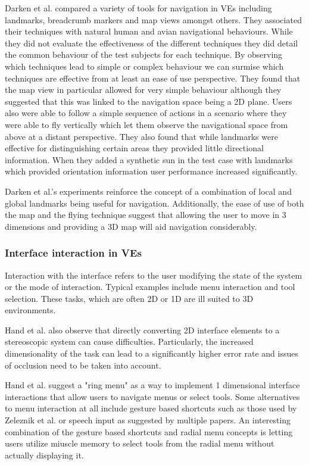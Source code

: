 \documentclass{sig-alternate-05-2015}
\begin{document}
Darken et al. compared a variety of tools for navigation in VEs including landmarks, breadcrumb markers and map views amongst others\cite{Darken1993}. They associated their techniques with natural human and avian  navigational behaviours. While they did not evaluate the effectiveness of the different techniques they did detail the common behaviour of the test subjects for each technique. By observing which techniques lead to simple or complex behaviour we can surmise which techniques are effective from at least an ease of use perspective. They found that the map view in particular allowed for very simple behaviour although they suggested that this was linked to the navigation space being a 2D plane. Users also were able to follow a simple sequence of actions in a scenario where they were able to fly vertically which let them observe the navigational space from above at a distant perspective. They also found that while landmarks were effective for distinguishing certain areas they provided little directional information. When they added a synthetic sun in the test case with landmarks which provided orientation information user performance increased significantly.

Darken et al.'s experiments reinforce the concept of a combination of local and global landmarks being useful for navigation.\cite{Darken1993} Additionally, the ease of use of both the map and the flying technique suggest that allowing the user to move in 3 dimensions and providing a 3D map will aid navigation considerably. 
\subsubsection{Interface interaction in VEs}
 Interaction with the interface refers to the user modifying the state of the system or the mode of interaction\cite{Bowman2001}. Typical examples include menu interaction and tool selection. These tasks, which are often 2D or 1D are ill suited to 3D environments\cite{Bowman2001, Hand1997}.
 
 Hand et al. also observe that directly converting 2D interface elements to a stereoscopic system can cause difficulties.\cite{Hand1997} Particularly, the increased dimensionality of the task can lead to a significantly higher error rate and issues of occlusion need to be taken into account.
 
 Hand et al. suggest a "ring menu" as a way to implement 1 dimensional interface interactions that allow users to navigate menus or select tools.\cite{Hand1997} Some alternatives to menu interaction at all include gesture based shortcuts such as those used by Zeleznik et al.\cite{Zeleznik2007} or speech input as suggested by multiple papers. \cite{VanDam1997,Bowman2001,Hand1997} An interesting combination of the gesture based shortcuts and radial menu concepts is letting users utilize miuscle memory to select tools from the radial menu without actually displaying it.\cite{Kurtenbach1993}
 
\end{document}
